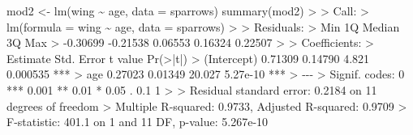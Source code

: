 \documentclass[
  letterpaper,
]{book}
\newenvironment{Shaded}{\begin{snugshade}}{\end{snugshade}}
\newcommand{\AttributeTok}[1]{\textcolor[rgb]{0.40,0.45,0.13}{#1}}
\newcommand{\DecValTok}[1]{\textcolor[rgb]{0.68,0.00,0.00}{#1}}
\newcommand{\ErrorTok}[1]{\textcolor[rgb]{0.68,0.00,0.00}{#1}}
\newcommand{\FloatTok}[1]{\textcolor[rgb]{0.68,0.00,0.00}{#1}}
\newcommand{\FunctionTok}[1]{\textcolor[rgb]{0.28,0.35,0.67}{#1}}
\newcommand{\NormalTok}[1]{\textcolor[rgb]{0.00,0.23,0.31}{#1}}
\newcommand{\OtherTok}[1]{\textcolor[rgb]{0.00,0.23,0.31}{#1}}
\newcommand{\SpecialCharTok}[1]{\textcolor[rgb]{0.37,0.37,0.37}{#1}}
\newcommand{\StringTok}[1]{\textcolor[rgb]{0.13,0.47,0.30}{#1}}
\begin{document}
\begin{Shaded}
\begin{Highlighting}[]
\NormalTok{mod2 }\OtherTok{\textless{}{-}} \FunctionTok{lm}\NormalTok{(wing }\SpecialCharTok{\textasciitilde{}}\NormalTok{ age, }\AttributeTok{data =}\NormalTok{ sparrows)}
\FunctionTok{summary}\NormalTok{(mod2)}
\SpecialCharTok{\textgreater{}} 
\ErrorTok{\textgreater{}}\NormalTok{ Call}\SpecialCharTok{:}
\ErrorTok{\textgreater{}} \FunctionTok{lm}\NormalTok{(}\AttributeTok{formula =}\NormalTok{ wing }\SpecialCharTok{\textasciitilde{}}\NormalTok{ age, }\AttributeTok{data =}\NormalTok{ sparrows)}
\SpecialCharTok{\textgreater{}} 
\ErrorTok{\textgreater{}}\NormalTok{ Residuals}\SpecialCharTok{:}
\ErrorTok{\textgreater{}}\NormalTok{      Min       }\DecValTok{1}\NormalTok{Q   Median       }\DecValTok{3}\NormalTok{Q      Max }
\SpecialCharTok{\textgreater{}} \SpecialCharTok{{-}}\FloatTok{0.30699} \SpecialCharTok{{-}}\FloatTok{0.21538}  \FloatTok{0.06553}  \FloatTok{0.16324}  \FloatTok{0.22507} 
\SpecialCharTok{\textgreater{}} 
\ErrorTok{\textgreater{}}\NormalTok{ Coefficients}\SpecialCharTok{:}
\ErrorTok{\textgreater{}}\NormalTok{             Estimate Std. Error t value }\FunctionTok{Pr}\NormalTok{(}\SpecialCharTok{\textgreater{}}\ErrorTok{|}\NormalTok{t}\SpecialCharTok{|}\NormalTok{)    }
\SpecialCharTok{\textgreater{}}\NormalTok{ (Intercept)  }\FloatTok{0.71309}    \FloatTok{0.14790}   \FloatTok{4.821} \FloatTok{0.000535} \SpecialCharTok{**}\ErrorTok{*}
\ErrorTok{\textgreater{}}\NormalTok{ age          }\FloatTok{0.27023}    \FloatTok{0.01349}  \FloatTok{20.027} \FloatTok{5.27e{-}10} \SpecialCharTok{**}\ErrorTok{*}
\ErrorTok{\textgreater{}} \SpecialCharTok{{-}{-}{-}}
\ErrorTok{\textgreater{}}\NormalTok{ Signif. codes}\SpecialCharTok{:}  \DecValTok{0} \StringTok{\textquotesingle{}***\textquotesingle{}} \FloatTok{0.001} \StringTok{\textquotesingle{}**\textquotesingle{}} \FloatTok{0.01} \StringTok{\textquotesingle{}*\textquotesingle{}} \FloatTok{0.05} \StringTok{\textquotesingle{}.\textquotesingle{}} \FloatTok{0.1} \StringTok{\textquotesingle{} \textquotesingle{}} \DecValTok{1}
\SpecialCharTok{\textgreater{}} 
\ErrorTok{\textgreater{}}\NormalTok{ Residual standard error}\SpecialCharTok{:} \FloatTok{0.2184}\NormalTok{ on }\DecValTok{11}\NormalTok{ degrees of freedom}
\SpecialCharTok{\textgreater{}}\NormalTok{ Multiple R}\SpecialCharTok{{-}}\NormalTok{squared}\SpecialCharTok{:}  \FloatTok{0.9733}\NormalTok{,  Adjusted R}\SpecialCharTok{{-}}\NormalTok{squared}\SpecialCharTok{:}  \FloatTok{0.9709} 
\SpecialCharTok{\textgreater{}}\NormalTok{ F}\SpecialCharTok{{-}}\NormalTok{statistic}\SpecialCharTok{:} \FloatTok{401.1}\NormalTok{ on }\DecValTok{1}\NormalTok{ and }\DecValTok{11}\NormalTok{ DF,  p}\SpecialCharTok{{-}}\NormalTok{value}\SpecialCharTok{:} \FloatTok{5.267e{-}10}
\end{Highlighting}
\end{Shaded}
\end{document}
